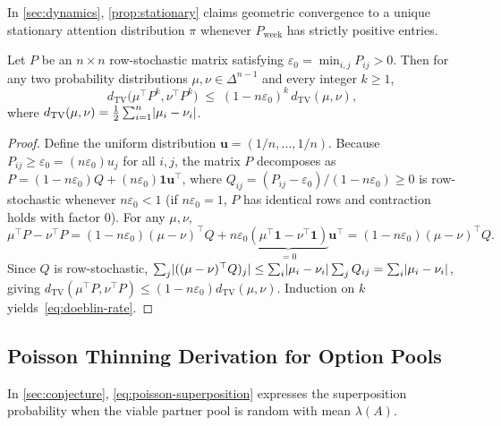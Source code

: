 In \cref{sec:dynamics}, \cref{prop:stationary} claims geometric convergence to a
unique stationary attention distribution $\pi$ whenever $P_{\mathrm{week}}$ has
strictly positive entries.

\begin{lemma}
\label{lem:app-doeblin}
Let $P$ be an $n \times n$ row-stochastic matrix satisfying
$\varepsilon_0 = \min_{i,j} P_{ij} > 0$. Then for any two probability
distributions $\mu, \nu \in \Delta^{n-1}$ and every integer $k \ge 1$,
\begin{equation}
  d_{\mathrm{TV}}\bigl(\mu^\top P^k, \nu^\top P^k\bigr)
  \;\le\; (1 - n\varepsilon_0)^k\, d_{\mathrm{TV}}(\mu, \nu),
  \label{eq:doeblin-rate}
\end{equation}
where $d_{\mathrm{TV}}(\mu, \nu) = \frac{1}{2}\sum_{i=1}^n \lvert \mu_i - \nu_i \rvert$.
\end{lemma}
\begin{proof}
Define the uniform distribution $\mathbf{u} = (1/n, \dots, 1/n)$. Because
$P_{ij} \ge \varepsilon_0 = (n\varepsilon_0) u_j$ for all $i, j$, the matrix
$P$ decomposes as $P = (1 - n\varepsilon_0) Q + (n\varepsilon_0) \mathbf{1}\mathbf{u}^\top$,
where $Q_{ij} = (P_{ij} - \varepsilon_0)/(1 - n\varepsilon_0) \ge 0$ is row-stochastic
whenever $n\varepsilon_0 < 1$ (if $n\varepsilon_0 = 1$, $P$ has identical rows
and contraction holds with factor $0$). For any $\mu, \nu$,
\begin{equation*}
  \mu^\top P - \nu^\top P
  = (1 - n\varepsilon_0)(\mu - \nu)^\top Q + n\varepsilon_0 \underbrace{(\mu^\top \mathbf{1} - \nu^\top \mathbf{1})}_{=0}\mathbf{u}^\top
  = (1 - n\varepsilon_0)(\mu - \nu)^\top Q.
\end{equation*}
Since $Q$ is row-stochastic, $\sum_j \lvert ((\mu - \nu)^\top Q)_j \rvert \le \sum_i \lvert \mu_i - \nu_i \rvert\sum_j Q_{ij} = \sum_i \lvert \mu_i - \nu_i \rvert$,
giving $d_{\mathrm{TV}}(\mu^\top P, \nu^\top P) \le (1 - n\varepsilon_0) d_{\mathrm{TV}}(\mu, \nu)$.
Induction on $k$ yields~\eqref{eq:doeblin-rate}.
\end{proof}

\subsection{Poisson Thinning Derivation for Option Pools}
\label{app:proof-poisson}

In \cref{sec:conjecture}, \cref{eq:poisson-superposition} expresses the
superposition probability when the viable partner pool is random with mean
$\lambda(A)$.

